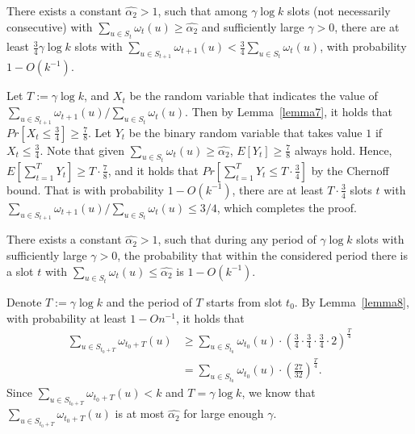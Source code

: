 \begin{lemma}
    \label{lemma8}
    There exists a constant $\hat{\alpha_2} > 1$,
    such that among $\gamma\log k$ slots (not necessarily consecutive)
    with ${\sum}_{u\in S_t}\omega_t(u) \geq \hat{\alpha_2}$ and sufficiently
    large $\gamma > 0$, there are at least $\frac{3}{4}\gamma\log k$ slots
    with ${\sum}_{u\in S_{t+1}}\omega_{t+1}(u) < \frac{3}{4}{\sum}_{u\in S_t}\omega_t(u)$,
    with probability $1-O(k^{-1})$.
\end{lemma}
\begin{IEEEproof}
    Let $T := \gamma\log k$, and $X_t$ be the random variable that indicates the value of 
    ${\sum}_{u\in S_{t+1}}\omega_{t+1}(u) / {\sum}_{u\in S_t}\omega_t(u)$. Then
    by Lemma~\ref{lemma7}, it holds that $Pr[X_t \leq \frac{3}{4}] \geq \frac{7}{8}$.
    Let $Y_t$ be the binary random variable that takes value $1$ if $X_t \leq \frac{3}{4}$.
    Note that given ${\sum}_{u\in S_t}\omega_t(u) \geq \hat{\alpha_2}$, $E[Y_t] \geq \frac{7}{8}$
    always hold. Hence, $E[\sum_{t=1}^{T}Y_t] \geq T\cdot\frac{7}{8}$, and it holds that
    $Pr[\sum_{t=1}^{T}Y_t\leq T\cdot\frac{3}{4}]$ by the Chernoff bound. That is with probability 
    $1-O(k^{-1})$, there are at least $T\cdot\frac{3}{4}$ slots $t$ with 
    ${\sum}_{u\in S_{t+1}}\omega_{t+1}(u) / {\sum}_{u\in S_t}\omega_t(u) \leq 3/4$, which completes the proof. 
\end{IEEEproof}


\begin{lemma}
    \label{lemma9}
    There exists a constant $\hat{\alpha_2} > 1$, such that
    during any period of $\gamma\log k$ slots with sufficiently large 
    $\gamma >0$, the probability that within the considered period there
    is a slot $t$ with ${\sum}_{u\in S_t}\omega_t(u) \leq \hat{\alpha_2}$
    is $1-O(k^{-1})$.
\end{lemma}
\begin{IEEEproof}
    Denote $T :=\gamma\log k$ and the period of $T$ starts from slot $t_0$.
    By Lemma~\ref{lemma8}, with probability at least $1-O{n^{-1}}$, it holds that 
    \begin{align*}
        {\sum}_{u\in S_{t_0+T}}\omega_{t_0+T}(u)  &\geq 
        {\sum}_{u\in S_{t_0}}\omega_{t_0}(u)\cdot(\frac{3}{4}\cdot\frac{3}{4}
        \cdot\frac{3}{4}\cdot 2)^{\frac{T}{4}} \\
       &={\sum}_{u\in S_{t_0}}\omega_{t_0}(u)\cdot(\frac{27}{32})^{\frac{T}{4}}.
    \end{align*} 
    Since $\sum_{u\in S_{t_0+T}}\omega_{t_0+T}(u) < k$ and $T = \gamma\log k$,
    we know that $\sum_{u\in S_{t_0+T}}\omega_{t_0+T}(u)$ is at most $\hat{\alpha_2}$ 
    for large enough $\gamma$.
\end{IEEEproof}


